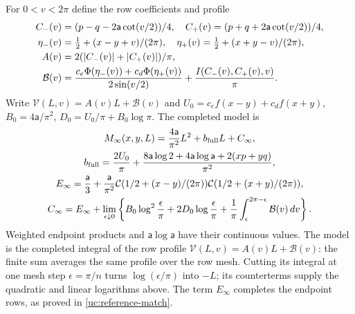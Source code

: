For $0<v<2\pi$ define the row coefficients and profile
\begin{align}\label{uc:row-profile}
 C_-(v)&=(p-q-2\mathsf{a}\cot(v/2))/4,\quad C_+(v)=(p+q+2\mathsf{a}\cot(v/2))/4,\notag\\
 \eta_-(v)&=\tfrac12+(x-y+v)/(2\pi),\quad
 \eta_+(v)=\tfrac12+(x+y-v)/(2\pi),\notag\\
 A(v)&=2(|C_-(v)|+|C_+(v)|)/\pi,\notag\\
 \mathcal B(v)&=\frac{c_e\Phi(\eta_-(v))+c_d\Phi(\eta_+(v))}
                         {2\sin(v/2)}+\frac{I(C_-(v),C_+(v),v)}\pi.
\end{align}
Write $\mathcal{V}(L,v)=A(v)L+\mathcal B(v)$ and
$U_0=c_ef(x-y)+c_df(x+y)$, $B_0=4\mathsf{a}/\pi^2$,
$D_0=U_0/\pi+B_0\log\pi$. The completed model is
\begin{equation}\label{uc:completed-model}
 \begin{gathered}
 M_\infty(x,y,L)=\frac{4\mathsf{a}}{\pi^2}L^2+b_{\rm full}L+C_\infty,\\
 b_{\rm full}=\frac{2U_0}\pi+
 \frac{8\mathsf{a}\log2+4\mathsf{a}\log \mathsf{a}+2(xp+yq)}{\pi^2},\\
 E_\infty=\frac {\mathsf{a}}{3}+
 \frac{\mathsf{a}}{\pi^2}\mathcal C(1/2+(x-y)/(2\pi))
                         \mathcal C(1/2+(x+y)/(2\pi)),\\
 C_\infty=E_\infty+\lim_{\epsilon\downarrow0}
 \left\{B_0\log^2\frac\epsilon\pi+2D_0\log\frac\epsilon\pi
            +\frac1\pi\int_\epsilon^{2\pi-\epsilon}\mathcal B(v)\,dv\right\}.
 \end{gathered}
\end{equation}
Weighted endpoint products and $\mathsf{a}\log \mathsf{a}$ have their continuous values.
The model is the completed integral of the row profile
$\mathcal V(L,v)=A(v)L+\mathcal B(v)$: the finite sum averages the
same profile over the row mesh. Cutting its integral at one mesh step
$\epsilon=\pi/n$ turns $\log(\epsilon/\pi)$ into $-L$; its
counterterms supply the quadratic and linear logarithms above.
The term $E_\infty$ completes the endpoint rows, as proved in
\eqref{uc:reference-match}.

